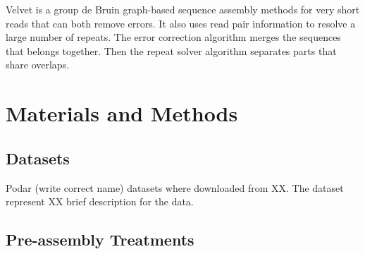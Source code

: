 Velvet \cite{velvet} is a group de Bruin graph-based sequence assembly methods for very short reads that can both remove errors. It also uses read pair information to resolve a large number of repeats.  The error correction algorithm merges the sequences that belongs together. Then the repeat solver algorithm separates parts that share overlaps. 

\section*{Materials and Methods}

\subsection*{Datasets}


Podar (write correct name) datasets where downloaded from XX. The dataset represent XX brief description for the data. 

\subsection*{Pre-assembly Treatments  }

